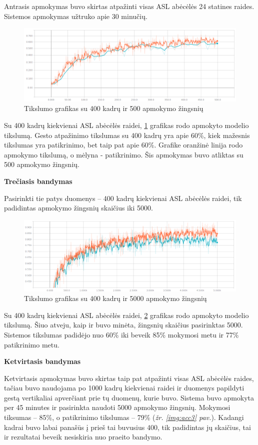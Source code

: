\documentclass{VUMIFInfKursinis}
\begin{document}
Antrasis apmokymas buvo skirtas atpažinti visas ASL abėcėlės 24 statines raides. Sistemos apmokymas užtruko apie 30 minučių.

\begin{figure}[H]
	\centering
	\includegraphics[width=.8\linewidth]{img/accuracy}
	\caption{Tikslumo grafikas su 400 kadrų ir 500 apmokymo žingsnių}
	\label{img:acc}
\end{figure}

Su 400 kadrų kiekvienai ASL abėcėlės raidei, \ref{img:acc} grafikas rodo apmokyto modelio tikslumą. Gesto atpažinimo tikslumas su 400 kadrų yra apie 60\%, kiek mažesnis tikslumas yra patikrinimo, bet taip pat apie 60\%. Grafike oranžinė linija rodo apmokymo tikslumą, o mėlyna - patikrinimo. Šis apmokymas buvo atliktas su 500 apmokymo žingsnių.

\textbf{Trečiasis bandymas}

Pasirinkti tie patys duomenys – 400 kadrų kiekvienai ASL abėcėlės raidei, tik padidintas apmokymo žingsnių skaičius iki 5000.

\begin{figure}[H]
	\centering
	\includegraphics[width=.8\linewidth]{img/accuracy2}
	\caption{Tikslumo grafikas su 400 kadrų ir 5000 apmokymo žingsnių}
	\label{img:acc2}
\end{figure}

Su 400 kadrų kiekvienai ASL abėcėlės raidei, \ref{img:acc2} grafikas rodo apmokyto modelio tikslumą. Šiuo atveju, kaip ir buvo minėta, žingsnių skaičius pasirinktas 5000. Sistemos tikslumas padidėjo nuo 60\% iki beveik 85\% mokymosi metu ir 77\% patikrinimo metu.

\textbf{Ketvirtasis bandymas}

Ketvirtasis apmokymas buvo skirtas taip pat atpažinti visas ASL abėcėlės raides, tačiau buvo naudojama po 1000 kadrų kiekvienai raidei ir duomenys papildyti gestą vertikaliai apverčiant prie tų duomenų, kurie buvo. Sistema buvo apmokyta per 45 minutes ir pasirinkta naudoti 5000 apmokymo žingsnių. Mokymosi tiksumas – 85\%, o patikrinimo tikslumas – 79\% (\textit{žr. \ref{img:acc3} pav.}). Kadangi kadrai buvo labai panašūs į prieš tai buvusius 400, tik padidintas jų skaičius, tai ir rezultatai beveik nesiskiria nuo praeito bandymo. 
\end{document}
